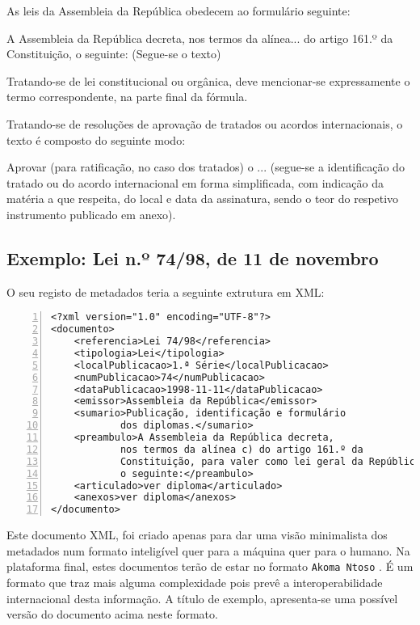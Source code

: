As leis da Assembleia da República obedecem ao formulário seguinte:
\begin{quoting}
A Assembleia da República decreta, nos termos da alínea... do artigo 161.º da Constituição, o seguinte:
(Segue-se o texto)
\end{quoting}

Tratando-se de lei constitucional ou orgânica, deve mencionar-se expressamente o termo correspondente, 
na parte final da fórmula. 

Tratando-se de resoluções de aprovação de tratados ou acordos internacionais, o texto é composto do seguinte modo:
\begin{quoting}
Aprovar (para ratificação, no caso dos tratados) o ... 
(segue-se a identificação do tratado ou do acordo internacional em forma simplificada, 
com indicação da matéria a que respeita, do local e data da assinatura, sendo o teor do respetivo 
instrumento publicado em anexo).
\end{quoting}

\subsection{Exemplo: Lei n.º 74/98, de 11 de novembro} 

O seu registo de metadados teria a seguinte extrutura em XML:

\begin{Verbatim}[frame=single, numbers=left, fontsize=\small, commandchars=\\\{\}]
<?xml version="1.0" encoding="UTF-8"?>
<documento>
    <referencia>Lei 74/98</referencia>
    <tipologia>Lei</tipologia>
    <localPublicacao>1.ª Série</localPublicacao>
    <numPublicacao>74</numPublicacao>
    <dataPublicacao>1998-11-11</dataPublicacao>
    <emissor>Assembleia da República</emissor>
    <sumario>Publicação, identificação e formulário 
            dos diplomas.</sumario>
    <preambulo>A Assembleia da República decreta, 
            nos termos da alínea c) do artigo 161.º da 
            Constituição, para valer como lei geral da República, 
            o seguinte:</preambulo>
    <articulado>ver diploma</articulado>
    <anexos>ver diploma</anexos>
</documento>
\end{Verbatim}

Este documento XML, foi criado apenas para dar uma visão minimalista dos metadados num formato inteligível quer 
para a máquina quer para o humano. Na plataforma final, estes documentos terão de estar no formato 
\texttt{Akoma Ntoso} \cite{akoma-ntoso}.
É um formato que traz mais alguma complexidade pois prevê a interoperabilidade internacional desta informação.
A título de exemplo, apresenta-se uma possível versão do documento acima neste formato.


